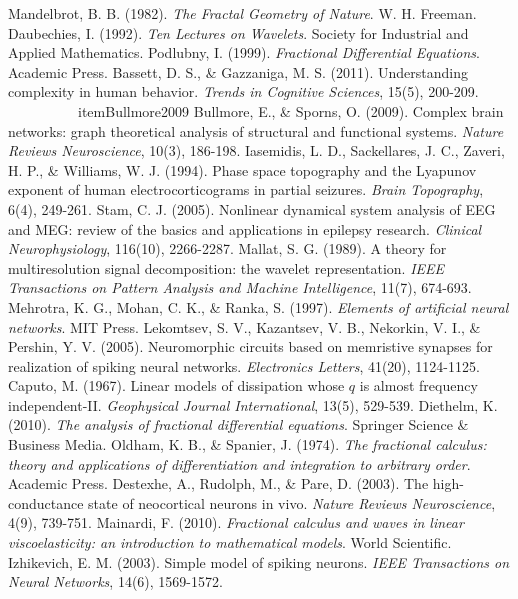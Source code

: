 \documentclass{article}
\begin{document}
\begin{thebibliography}{16}
 Mandelbrot, B. B. (1982). \textit{The Fractal Geometry of Nature}. W. H. Freeman.
 Daubechies, I. (1992). \textit{Ten Lectures on Wavelets}. Society for Industrial and Applied Mathematics.
 Podlubny, I. (1999). \textit{Fractional Differential Equations}. Academic Press.
 Bassett, D. S., \& Gazzaniga, M. S. (2011). Understanding complexity in human behavior. \textit{Trends in Cognitive Sciences}, 15(5), 200-209.
\bib　　　　　item{Bullmore2009} Bullmore, E., \& Sporns, O. (2009). Complex brain networks: graph theoretical analysis of structural and functional systems. \textit{Nature Reviews Neuroscience}, 10(3), 186-198.
 Iasemidis, L. D., Sackellares, J. C., Zaveri, H. P., \& Williams, W. J. (1994). Phase space topography and the Lyapunov exponent of human electrocorticograms in partial seizures. \textit{Brain Topography}, 6(4), 249-261.
 Stam, C. J. (2005). Nonlinear dynamical system analysis of EEG and MEG: review of the basics and applications in epilepsy research. \textit{Clinical Neurophysiology}, 116(10), 2266-2287.
 Mallat, S. G. (1989). A theory for multiresolution signal decomposition: the wavelet representation. \textit{IEEE Transactions on Pattern Analysis and Machine Intelligence}, 11(7), 674-693.
 Mehrotra, K. G., Mohan, C. K., \& Ranka, S. (1997). \textit{Elements of artificial neural networks}. MIT Press.
 Lekomtsev, S. V., Kazantsev, V. B., Nekorkin, V. I., \& Pershin, Y. V. (2005). Neuromorphic circuits based on memristive synapses for realization of spiking neural networks. \textit{Electronics Letters}, 41(20), 1124-1125.
 Caputo, M. (1967). Linear models of dissipation whose $q$ is almost frequency independent-II. \textit{Geophysical Journal International}, 13(5), 529-539.
 Diethelm, K. (2010). \textit{The analysis of fractional differential equations}. Springer Science \& Business Media.
 Oldham, K. B., \& Spanier, J. (1974). \textit{The fractional calculus: theory and applications of differentiation and integration to arbitrary order}. Academic Press.
 Destexhe, A., Rudolph, M., \& Pare, D. (2003). The high-conductance state of neocortical neurons in vivo. \textit{Nature Reviews Neuroscience}, 4(9), 739-751.
 Mainardi, F. (2010). \textit{Fractional calculus and waves in linear viscoelasticity: an introduction to mathematical models}. World Scientific.
 Izhikevich, E. M. (2003). Simple model of spiking neurons. \textit{IEEE Transactions on Neural Networks}, 14(6), 1569-1572.
\end{thebibliography}
\end{document}
